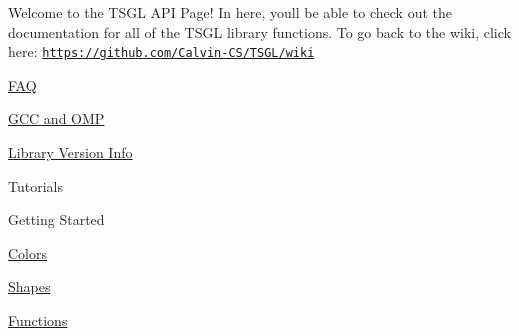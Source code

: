 Welcome to the T\+S\+G\+L A\+P\+I Page! In here, you\textquotesingle{}ll be able to check out the documentation for all of the T\+S\+G\+L library functions. To go back to the wiki, click here\+: \href{https://github.com/Calvin-CS/TSGL/wiki}{\tt https\+://github.\+com/\+Calvin-\/\+C\+S/\+T\+S\+G\+L/wiki}
\begin{DoxyItemize}
\item \hyperlink{md__home_pretzel_workspace_tsgl__t_s_g_l_docs-wiki__f_a_q}{F\+A\+Q}
\item \hyperlink{md__home_pretzel_workspace_tsgl__t_s_g_l_docs-wiki__g_c_c-and-_o_m_p}{G\+C\+C and O\+M\+P}
\item \hyperlink{md__home_pretzel_workspace_tsgl__t_s_g_l_docs-wiki__library-_versions}{Library Version Info}
\item Tutorials
\begin{DoxyItemize}
\item Getting Started
\item \hyperlink{md__home_pretzel_workspace_tsgl__t_s_g_l_docs-wiki_tutorials__using-_colors}{Colors}
\item \hyperlink{md__home_pretzel_workspace_tsgl__t_s_g_l_docs-wiki_tutorials__using-_shapes}{Shapes}
\item \hyperlink{md__home_pretzel_workspace_tsgl__t_s_g_l_docs-wiki_tutorials__using-_functions}{Functions}
\end{DoxyItemize}
\end{DoxyItemize}